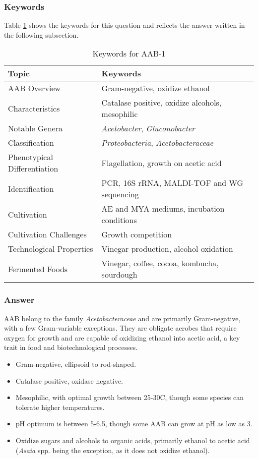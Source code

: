 \subsubsection*{Keywords}
Table \ref{tab:KW-AAB1} shows the keywords for this question and reflects the answer written in the following subsection.
\begin{table}[h]
    \centering
    \caption{Keywords for AAB-1} 
    \label{tab:KW-AAB1}
    \begin{tabular}{l|l}
        \textbf{Topic} & \textbf{Keywords} \\
        \hline
        AAB Overview & Gram-negative, oxidize ethanol \\
        Characteristics & Catalase positive, oxidize alcohols, mesophilic \\
        Notable Genera & \textit{Acetobacter}, \textit{Gluconobacter} \\
        Classification & \textit{Proteobacteria}, \textit{Acetobacteraceae} \\
        Phenotypical Differentiation & Flagellation, growth on acetic acid \\
        Identification & PCR, 16S rRNA, MALDI-TOF and WG sequencing\\
        Cultivation & AE and MYA mediums, incubation conditions \\
        Cultivation Challenges & Growth competition \\
        Technological Properties & Vinegar production, alcohol oxidation \\
        Fermented Foods & Vinegar, coffee, cocoa, kombucha, sourdough \\
    \end{tabular}
\end{table}

\subsubsection*{Answer}
AAB belong to the family \textit{Acetobacteraceae} and are primarily Gram-negative, with a few Gram-variable exceptions. They are obligate aerobes that require oxygen for growth and are capable of oxidizing ethanol into acetic acid, a key trait in food and biotechnological processes.

\begin{itemize}
    \item Gram-negative, ellipsoid to rod-shaped.
    \item Catalase positive, oxidase negative.
    \item Mesophilic, with optimal growth between 25-30\textdegree C, though some species can tolerate higher temperatures.
    \item pH optimum is between 5-6.5, though some AAB can grow at pH as low as 3.
    \item Oxidize sugars and alcohols to organic acids, primarily ethanol to acetic acid (\textit{Asaia} spp. being the exception, as it does not oxidize ethanol).
\end{itemize}

